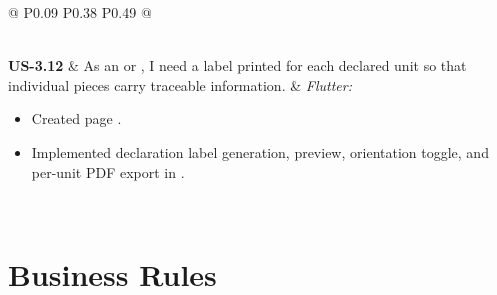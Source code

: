 \begin{longtable}{@{} P{0.09\linewidth} P{0.38\linewidth} P{0.49\linewidth} @{}}
\begin{itemize}[noitemsep, topsep=0pt, partopsep=0pt, leftmargin=*]
	\end{itemize} \\
	\midrule
	\textbf{US-3.12}
	& As an  or , I need a label printed
	for each declared unit so that individual pieces carry traceable information.
	& \noindent\textit{Flutter:}
	\begin{itemize}[noitemsep, topsep=0pt, partopsep=0pt, leftmargin=*]
		\item Created page .
		\item Implemented declaration label generation, preview, orientation toggle, and per-unit PDF export in .
	\end{itemize} \\
\end{longtable}


\section{Business Rules}


